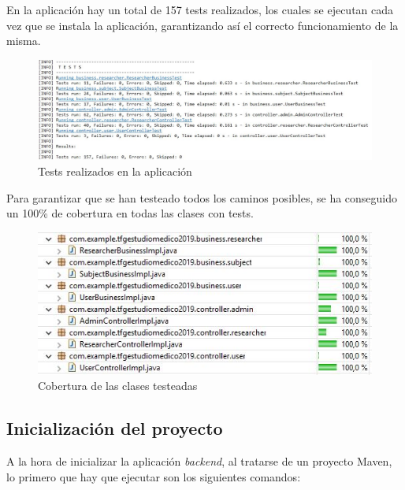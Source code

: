         En la aplicación hay un total de 157 tests realizados, los cuales se ejecutan cada vez que se instala la aplicación, garantizando así el correcto funcionamiento de la misma.
        \newline
        
          \begin{figure}[h]
            \centering
            \includegraphics[width=1\textwidth]{images/numtests.JPG}
            \caption{Tests realizados en la aplicación}
        \end{figure}
        
        Para garantizar que se han testeado todos los caminos posibles, se ha conseguido un 100\% de cobertura en todas las clases con tests.
        \newline
        
        
          \begin{figure}[h]
            \centering
            \includegraphics[width=1\textwidth]{images/coberturatests.JPG}
            \caption{Cobertura de las clases testeadas}
        \end{figure}
        \FloatBarrier
        

        
        
    \subsection{Inicialización del proyecto}
        A la hora de inicializar la aplicación \textit{backend}, al tratarse de un proyecto  Maven, lo primero que hay que ejecutar son los siguientes comandos: 
        
